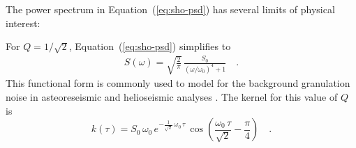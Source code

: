 \documentclass[manuscript, letterpaper]{aastex6}
\renewcommand{\eqref}[1]{\ref{eq:#1}}
\newcommand{\Eq}[1]{Equation~(\eqref{#1})}
\newcommand{\eq}[1]{\Eq{#1}}
\newcommand{\eqlabel}[1]{\label{eq:#1}}
\begin{document}
The power spectrum in \eq{sho-psd} has several limits of physical interest:
\begin{itemize}

    {\item For $Q = 1/\sqrt{2}$, \eq{sho-psd} simplifies to
          \begin{eqnarray}\eqlabel{granulation-psd}
              S(\omega) = \sqrt{\frac{2}{\pi}}\,\frac{S_0}{(\omega/\omega_0)^4+1} \quad.
          \end{eqnarray}
          This functional form is commonly used to model for the background granulation
          noise in asteoreseismic and helioseismic analyses \citep{Harvey:1985, Michel:2009,
              Kallinger:2014}.
          The kernel for this value of $Q$ is
          \begin{equation}
              k(\tau) = S_0\,\omega_0\,e^{-\frac{1}{\sqrt{2}}\,\omega_0\,\tau}\,
              \cos{\left(\frac{\omega_0\,\tau}{\sqrt{2}}-\frac{\pi}{4}\right)} \quad.
          \end{equation}}


\end{itemize}
\end{document}

